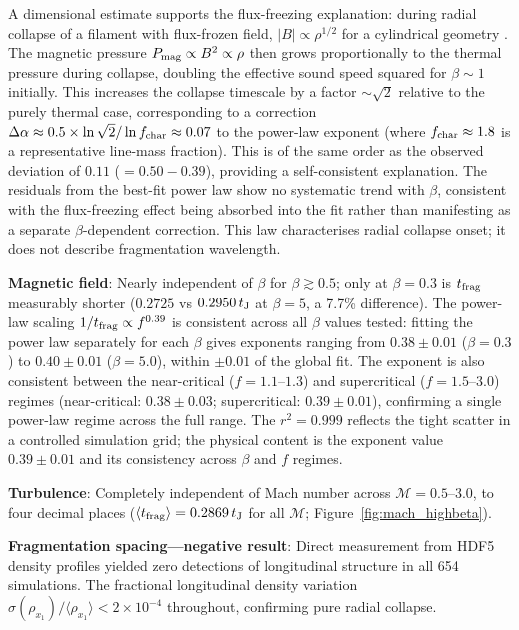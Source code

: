 \documentclass[twoside,twocolumn]{mnras}
\begin{document}
A dimensional estimate supports the flux-freezing explanation: during radial collapse of a filament with flux-frozen field, $|B| \propto \rho^{1/2}$ for a cylindrical geometry \citep{Nakamura1993}. The magnetic pressure $P_{\rm mag} \propto B^2 \propto \rho$ then grows proportionally to the thermal pressure during collapse, doubling the effective sound speed squared for $\beta \sim 1$ initially. This increases the collapse timescale by a factor $\sim\sqrt{2}$ relative to the purely thermal case, corresponding to a correction $\Delta\alpha \approx 0.5 \times \ln\sqrt{2}/\ln f_{\rm char} \approx 0.07$ to the power-law exponent (where $f_{\rm char} \approx 1.8$ is a representative line-mass fraction). This is of the same order as the observed deviation of $0.11$ ($= 0.50 - 0.39$), providing a self-consistent explanation. The residuals from the best-fit power law show no systematic trend with $\beta$, consistent with the flux-freezing effect being absorbed into the fit rather than manifesting as a separate $\beta$-dependent correction.
This law characterises radial collapse onset; it does not describe fragmentation wavelength.

\textbf{Magnetic field}: Nearly independent of $\beta$ for $\beta \gtrsim 0.5$; only
at $\beta = 0.3$ is $t_{\rm frag}$ measurably shorter ($0.2725$ vs $0.2950\,t_{\rm J}$
at $\beta = 5$, a 7.7\% difference). The power-law scaling $1/t_{\rm frag} \propto f^{0.39}$
is consistent across all $\beta$ values tested: fitting the power law separately for each
$\beta$ gives exponents ranging from $0.38 \pm 0.01$ ($\beta = 0.3$) to $0.40 \pm 0.01$
($\beta = 5.0$), within $\pm 0.01$ of the global fit. The exponent is also consistent
between the near-critical ($f = 1.1$--$1.3$) and supercritical ($f = 1.5$--$3.0$)
regimes (near-critical: $0.38 \pm 0.03$; supercritical: $0.39 \pm 0.01$), confirming
a single power-law regime across the full range. The $r^2 = 0.999$ reflects the tight
scatter in a controlled simulation grid; the physical content is the exponent value
$0.39 \pm 0.01$ and its consistency across $\beta$ and $f$ regimes.

\textbf{Turbulence}: Completely independent of Mach number across $\mathcal{M} = 0.5$--$3.0$,
to four decimal places ($\langle t_{\rm frag} \rangle = 0.2869\,t_{\rm J}$ for all $\mathcal{M}$;
Figure~\ref{fig:mach_highbeta}).

\textbf{Fragmentation spacing---negative result}: Direct measurement from HDF5 density
profiles yielded zero detections of longitudinal structure in all 654 simulations.
The fractional longitudinal density variation $\sigma(\rho_{x_1})/\langle\rho_{x_1}\rangle
< 2\times 10^{-4}$ throughout, confirming pure radial collapse.
\end{document}
